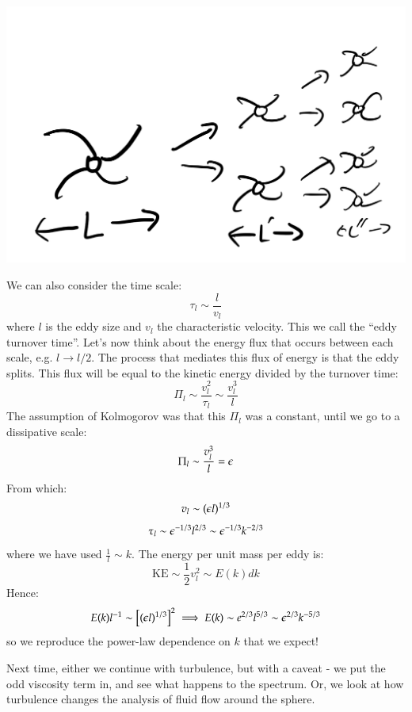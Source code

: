 \begin{center}
    \includegraphics[scale=0.35]{Lectures/Images/lec11-splittingeddy.png}
\end{center}

We can also consider the time scale:
\begin{equation}
    \tau_l \sim \frac{l}{v_l}
\end{equation}
where $l$ is the eddy size and $v_l$ the characteristic velocity. This we call the ``eddy turnover time''. Let's now think about the energy flux that occurs between each scale, e.g. $l \to l/2$. The process that mediates this flux of energy is that the eddy splits. This flux will be equal to the kinetic energy divided by the turnover time:
\begin{equation}
    \Pi_l \sim \frac{v_l^2}{\tau_l} \sim \frac{v_l^3}{l}
\end{equation}
The assumption of Kolmogorov was that this $\Pi_l$ was a constant, until we go to a dissipative scale:
\begin{equation}
    \Pi_l \sim \frac{v_l^3}{l} = \epsilon
\end{equation}
From which:
\begin{equation}
    v_l \sim (\epsilon l)^{1/3}
\end{equation}
\begin{equation}
    \tau_l \sim \epsilon^{-1/3}l^{2/3} \sim \epsilon^{-1/3}k^{-2/3}
\end{equation}
where we have used $\frac{1}{l} \sim k$. The energy per unit mass per eddy is:
\begin{equation}
    \text{KE} \sim \frac{1}{2}v_l^2 \sim E(k)dk
\end{equation}
Hence:
\begin{equation}
    E(k)l^{-1} \sim \left[(\epsilon l)^{1/3}\right]^2 \implies E(k) \sim e^{2/3}l^{5/3} \sim \epsilon^{2/3}k^{-5/3}
\end{equation}
so we reproduce the power-law dependence on $k$ that we expect!

Next time, either we continue with turbulence, but with a caveat - we put the odd viscosity term in, and see what happens to the spectrum. Or, we look at how turbulence changes the analysis of fluid flow around the sphere.